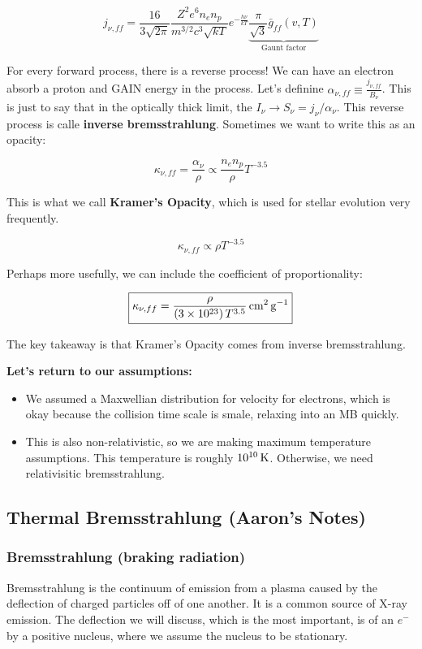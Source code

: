 \documentclass{article}
\newcommand{\unit}[1]{{\,\rm #1}}
\newcommand{\cm}{\unit{cm}}
\newcommand{\g}{\unit{g}}
\newcommand{\K}{\unit{K}}
\begin{document}
$$
\boxed{j_{\nu,ff} = \frac{16}{3\sqrt{2\pi}} \frac{Z^2 e^6 n_e n_p}{m^{3/2} c^3 \sqrt{kT}} e^{-\frac{h\nu}{kT}} \underbrace{\frac{\pi}{\sqrt3} \bar{g}_{ff}(v,T)}_\text{Gaunt factor}}
$$

For every forward process, there is a reverse process! We can have an electron absorb a proton and GAIN energy in the process. Let's definine $\alpha_{\nu,ff} \equiv \frac{j_{\nu,ff}}{B_{\nu}}$. This is just to say that in the optically thick limit, the $I_\nu \to S_\nu = j_\nu / \alpha_\nu$. This reverse process is calle \textbf{inverse bremsstrahlung}. Sometimes we want to write this as an opacity:

$$
\kappa_{\nu,ff} = \frac{\alpha_\nu}{\rho} \propto \frac{n_e n_p}{\rho}T^{-3.5}
$$

This is what we call \textbf{Kramer's Opacity}, which is used for stellar evolution very frequently. 

$$
\boxed{\kappa_{\nu,ff} \propto \rho T^{-3.5}}
$$

Perhaps more usefully, we can include the coefficient of proportionality: 

$$
\boxed{\kappa_{\nu,ff} = \frac{\rho} {\left(3 \times 10^{23}\right)T^{3.5}} \cm^{2} \g^{-1}}
$$

The key takeaway is that Kramer's Opacity comes from inverse bremsstrahlung.

\textbf{Let's return to our assumptions:}

\begin{itemize}
    \item We assumed a Maxwellian distribution for velocity for electrons, which is okay because the collision time scale is smale, relaxing into an MB quickly.
    \item This is also non-relativistic, so we are making maximum temperature assumptions. This temperature is roughly $10^{10} \K$. Otherwise, we need relativisitic bremsstrahlung. 
\end{itemize}


\subsection{Thermal Bremsstrahlung (Aaron's Notes)}

\subsubsection{ Bremsstrahlung (braking radiation)}

Bremsstrahlung is the continuum of emission from a plasma caused by
the deflection of charged particles off of one another.  It is a common source of X-ray emission.
The deflection we will discuss, which is the most important, is of an $e^-$ by a positive nucleus, where we assume the nucleus to be stationary.
\end{document}
